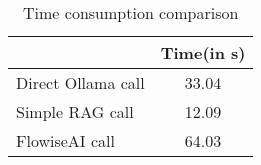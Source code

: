 \begin{table}[H]
\centering
\begin{tabular}[H]{|l|c|}
\toprule
 & Time(in s) \\
\midrule
Direct Ollama call & 33.04 \\
Simple RAG call & 12.09 \\
FlowiseAI call & 64.03 \\
\bottomrule
\end{tabular}
\caption{Time consumption comparison}
\end{table}
